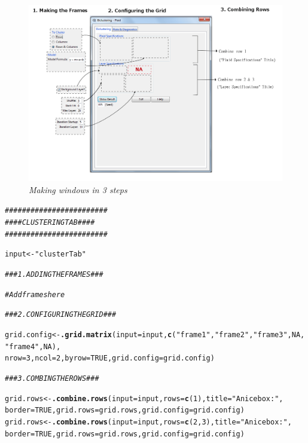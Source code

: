 \documentclass[a4paper]{article}\usepackage[]{graphicx}\usepackage[]{color}
\makeatletter
\newcommand{\hlnum}[1]{\textcolor[rgb]{0.686,0.059,0.569}{#1}}%
\newcommand{\hlstr}[1]{\textcolor[rgb]{0.192,0.494,0.8}{#1}}%
\newcommand{\hlcom}[1]{\textcolor[rgb]{0.678,0.584,0.686}{\textit{#1}}}%
\newcommand{\hlstd}[1]{\textcolor[rgb]{0.345,0.345,0.345}{#1}}%
\newcommand{\hlkwb}[1]{\textcolor[rgb]{0.69,0.353,0.396}{#1}}%
\newcommand{\hlkwc}[1]{\textcolor[rgb]{0.333,0.667,0.333}{#1}}%
\newcommand{\hlkwd}[1]{\textcolor[rgb]{0.737,0.353,0.396}{\textbf{#1}}}%
\newenvironment{kframe}{%
 \def\at@end@of@kframe{}%
 \ifinner\ifhmode%
  \def\at@end@of@kframe{\end{minipage}}%
  \begin{minipage}{\columnwidth}%
 \fi\fi%
 \def\FrameCommand##1{\hskip\@totalleftmargin \hskip-\fboxsep
 \colorbox{shadecolor}{##1}\hskip-\fboxsep
     \hskip-\linewidth \hskip-\@totalleftmargin \hskip\columnwidth}%
 \MakeFramed {\advance\hsize-\width
   \@totalleftmargin\z@ \linewidth\hsize
   \@setminipage}}%
 {\par\unskip\endMakeFramed%
 \at@end@of@kframe}
\newenvironment{knitrout}{}{} %
\makeatother
\begin{document}
\begin{figure}[H]
\centering
\includegraphics[scale=0.44]{figures/plaid_structure.png}
\caption{{\it Making windows in 3 steps}
\label{threesteps}}
\end{figure}
\begin{knitrout}
\color{fgcolor}\begin{kframe}
\begin{alltt}
\hlcom{########################}
\hlcom{#### CLUSTERING TAB ####}
\hlcom{########################}

\hlstd{input} \hlkwb{<-} \hlstr{"clusterTab"}

\hlcom{### 1. ADDING THE FRAMES ###}

\hlcom{# Add frames here}

\hlcom{### 2. CONFIGURING THE GRID ###}

\hlstd{grid.config} \hlkwb{<-} \hlkwd{.grid.matrix}\hlstd{(}\hlkwc{input}\hlstd{=input,}\hlkwd{c}\hlstd{(}\hlstr{"frame1"}\hlstd{,}\hlstr{"frame2"}\hlstd{,}\hlstr{"frame3"}\hlstd{,}\hlnum{NA}\hlstd{,}\hlstr{"frame4"}\hlstd{,}\hlnum{NA}\hlstd{),}
                    \hlkwc{nrow}\hlstd{=}\hlnum{3}\hlstd{,}\hlkwc{ncol}\hlstd{=}\hlnum{2}\hlstd{,}\hlkwc{byrow}\hlstd{=}\hlnum{TRUE}\hlstd{,}\hlkwc{grid.config}\hlstd{=grid.config)}


\hlcom{### 3. COMBING THE ROWS ###}

\hlstd{grid.rows} \hlkwb{<-} \hlkwd{.combine.rows}\hlstd{(}\hlkwc{input}\hlstd{=input,}\hlkwc{rows}\hlstd{=}\hlkwd{c}\hlstd{(}\hlnum{1}\hlstd{),}\hlkwc{title}\hlstd{=}\hlstr{"A nice box: "}\hlstd{,}
                    \hlkwc{border}\hlstd{=}\hlnum{TRUE}\hlstd{,}\hlkwc{grid.rows}\hlstd{=grid.rows,}\hlkwc{grid.config}\hlstd{=grid.config)}
\hlstd{grid.rows} \hlkwb{<-} \hlkwd{.combine.rows}\hlstd{(}\hlkwc{input}\hlstd{=input,}\hlkwc{rows}\hlstd{=}\hlkwd{c}\hlstd{(}\hlnum{2}\hlstd{,}\hlnum{3}\hlstd{),}\hlkwc{title}\hlstd{=}\hlstr{"A nice box: "}\hlstd{,}
                    \hlkwc{border}\hlstd{=}\hlnum{TRUE}\hlstd{,}\hlkwc{grid.rows}\hlstd{=grid.rows,}\hlkwc{grid.config}\hlstd{=grid.config)}
\end{alltt}
\end{kframe}
\end{knitrout}
\end{document}
